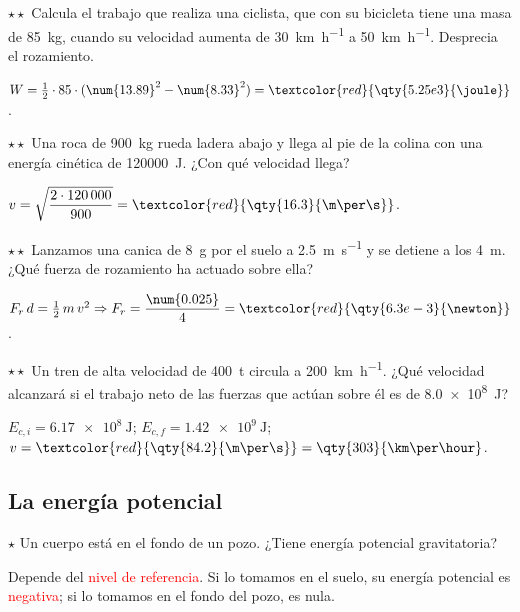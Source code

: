 \begin{exercise}
    \(\star\star\) Calcula el trabajo que realiza una ciclista, que con su bicicleta tiene una masa de \qty{85}{\kg}, cuando su velocidad
    aumenta de \qty{30}{\km\per\hour} a \qty{50}{\km\per\hour}. Desprecia el rozamiento.
    \begin{solu}
        \(W = \frac{1}{2} \cdot 85 \cdot (\num{13.89}^2 - \num{8.33}^2) = \textcolor{red}{\qty{5.25e3}{\joule}}\).
    \end{solu}
\end{exercise}

\begin{exercise}
    \(\star\star\) Una roca de \qty{900}{\kg} rueda ladera abajo y llega al pie de la colina con una energía cinética de
    \qty{120000}{\joule}. ¿Con qué velocidad llega?
    \begin{solu}
        \(v = \sqrt{\dfrac{2 \cdot 120\,000}{900}} = \textcolor{red}{\qty{16.3}{\m\per\s}}\).
    \end{solu}
\end{exercise}

\begin{exercise}
    \(\star\star\) Lanzamos una canica de \qty{8}{\g} por el suelo a \qty{2.5}{\m\per\s} y se detiene a los \qty{4}{\m}. ¿Qué fuerza de
    rozamiento ha actuado sobre ella?
    \begin{solu}
        \(F_r\,d = \frac{1}{2}\,m\,v^2 \Rightarrow F_r = \dfrac{\num{0.025}}{4} = \textcolor{red}{\qty{6.3e-3}{\newton}}\).
    \end{solu}
\end{exercise}

\begin{exercise}
    \(\star\star\) Un tren de alta velocidad de \qty{400}{t} circula a \qty{200}{\km\per\hour}. ¿Qué velocidad alcanzará si el trabajo
    neto de las fuerzas que actúan sobre él es de \qty{8.0e8}{\joule}?
    \begin{solu}
        \(E_{c,i} = \qty{6.17e8}{\joule}\); \(E_{c,f} = \qty{1.42e9}{\joule}\); \(v = \textcolor{red}{\qty{84.2}{\m\per\s}} = \qty{303}{\km\per\hour}\).
    \end{solu}
\end{exercise}

\subsection{La energía potencial}

\begin{exercise}
    \(\star\) Un cuerpo está en el fondo de un pozo. ¿Tiene energía potencial gravitatoria?
    \begin{solu}
        Depende del \textcolor{red}{nivel de referencia}. Si lo tomamos en el suelo, su energía potencial es
        \textcolor{red}{negativa}; si lo tomamos en el fondo del pozo, es nula.
    \end{solu}
\end{exercise}


